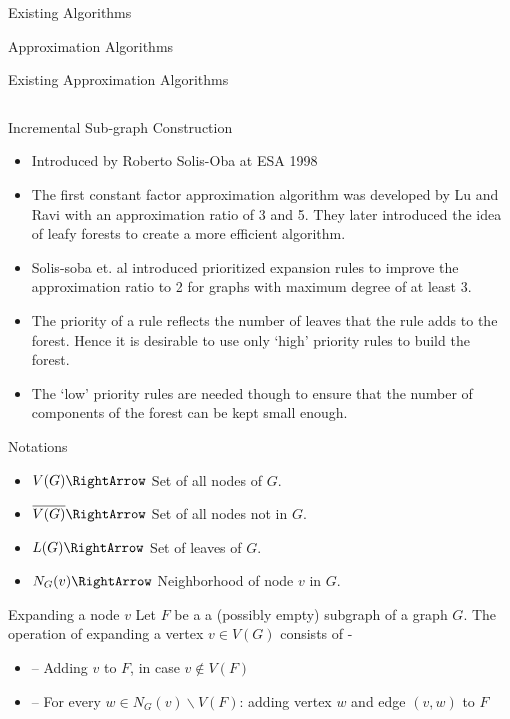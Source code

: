 \documentclass[xcolor=svgnames]{beamer}
\begin{document}
\begin{section}{Existing Algorithms}
\begin{subsection}{Approximation Algorithms}
\begin{frame}{Existing Approximation Algorithms}
\begin{tabular}{m{2.5cm}m{1.5cm}m{1.25cm}m{1.75cm}m{2.3cm}}
\end{tabular}
        \end{frame}
        \begin{frame}{Incremental Sub-graph Construction}
            \begin{itemize}
                \item Introduced by Roberto Solis-Oba at ESA 1998 
                \item The first constant factor approximation algorithm was developed by Lu and Ravi with an approximation ratio of 3 and 5\cite{lu1996power}. They later introduced the idea of leafy forests to create a more efficient algorithm\cite{LU1998132}.
                \item Solis-soba et. al introduced prioritized expansion rules to improve the approximation ratio to 2 for graphs with maximum degree of at least 3. 
                \item The priority of a rule reflects the number of leaves that the rule adds to the forest. Hence it is desirable to use only ‘high’ priority rules to build the forest.
                \item The ‘low’ priority rules are needed though to ensure that the number of components of the forest can be kept small enough.
            \end{itemize}
        \end{frame}
        \begin{frame}{Notations}
            \begin{itemize}
                \item $V(G) \RightArrow$ Set of all nodes of $G$.
                \item $\overline{V(G)} \RightArrow$ Set of all nodes not in $G$.
                \item $L(G) \RightArrow$ Set of leaves of $G$.
                \item $N_G(v) \RightArrow$ Neighborhood of node $v$ in $G$.
            \end{itemize}
            \begin{block}{Expanding a node $v$}
                Let $F$ be a a (possibly empty) subgraph of a graph $G$. The operation of expanding a vertex $v \in V(G)$ consists of -
                \begin{itemize}
                    \item[] -- Adding $v$ to $F$, in case $v \notin V(F)$
                    \item[] -- For every $w \in N_G(v) \backslash V(F)$: adding vertex $w$ and edge $(v,w)$ to $F$

\end{itemize}
\end{block}
\end{frame}
\end{subsection}
\end{section}
\end{document}
